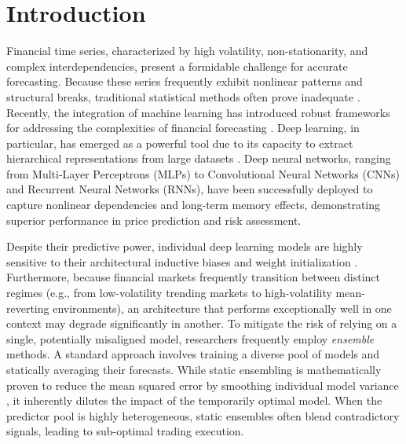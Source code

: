 \documentclass[pdflatex,sn-mathphys-num]{sn-jnl}
\theoremstyle{thmstyleone}%
\theoremstyle{thmstyletwo}%
\theoremstyle{thmstylethree}%
\begin{document}

\maketitle

\section{Introduction}

Financial time series, characterized by high volatility, non-stationarity, and complex interdependencies, present a formidable challenge for accurate forecasting. Because these series frequently exhibit nonlinear patterns and structural breaks, traditional statistical methods often prove inadequate \cite{tsay2005analysis}. Recently, the integration of machine learning has introduced robust frameworks for addressing the complexities of financial forecasting \cite{krollner2010financial}. Deep learning, in particular, has emerged as a powerful tool due to its capacity to extract hierarchical representations from large datasets \cite{sezer2020financial}. Deep neural networks, ranging from Multi-Layer Perceptrons (MLPs) to Convolutional Neural Networks (CNNs) and Recurrent Neural Networks (RNNs), have been successfully deployed to capture nonlinear dependencies and long-term memory effects, demonstrating superior performance in price prediction and risk assessment.

Despite their predictive power, individual deep learning models are highly sensitive to their architectural inductive biases and weight initialization \cite{mishkin2016all}. Furthermore, because financial markets frequently transition between distinct regimes (e.g., from low-volatility trending markets to high-volatility mean-reverting environments), an architecture that performs exceptionally well in one context may degrade significantly in another. To mitigate the risk of relying on a single, potentially misaligned model, researchers frequently employ \emph{ensemble} methods. A standard approach involves training a diverse pool of models and statically averaging their forecasts. While static ensembling is mathematically proven to reduce the mean squared error by smoothing individual model variance \cite{perrone1995networks}, it inherently dilutes the impact of the temporarily optimal model. When the predictor pool is highly heterogeneous, static ensembles often blend contradictory signals, leading to sub-optimal trading execution. 
\end{document}
